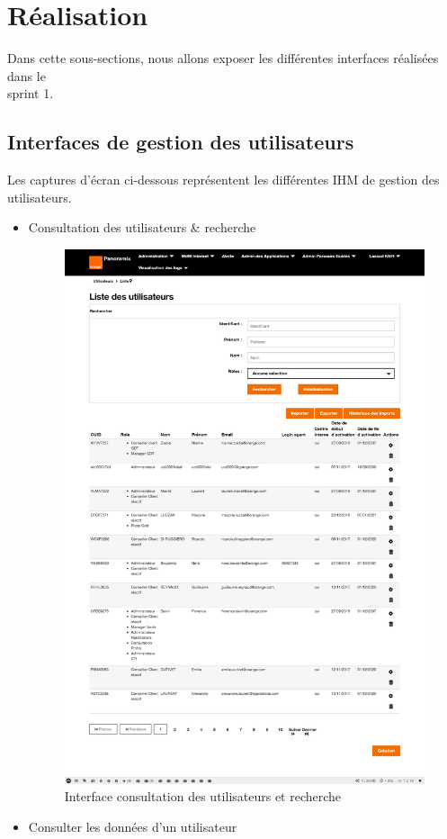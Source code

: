 \section[Réalisation]{Réalisation}
Dans cette sous-sections, nous allons exposer les différentes interfaces réalisées dans le \\sprint 1. 
\subsection[Interfaces de gestion des utilisateurs]{Interfaces de gestion des utilisateurs}
Les captures d'écran ci-dessous représentent les différentes IHM de gestion des utilisateurs.
\begin{itemize}
	\item Consultation des utilisateurs \& recherche
	\begin{figure}[H]
		\centering
		\includegraphics[width=0.7\linewidth]{img/screenshots/users/consultation}
		\caption[Interface consultation des utilisateurs et recherche]{Interface consultation des utilisateurs et recherche}
		\label{fig:consultation-user}
	\end{figure}
	\newpage
	\item Consulter les données d'un utilisateur
	\begin{figure}[H]
		\centering

\end{figure}
\end{itemize}
